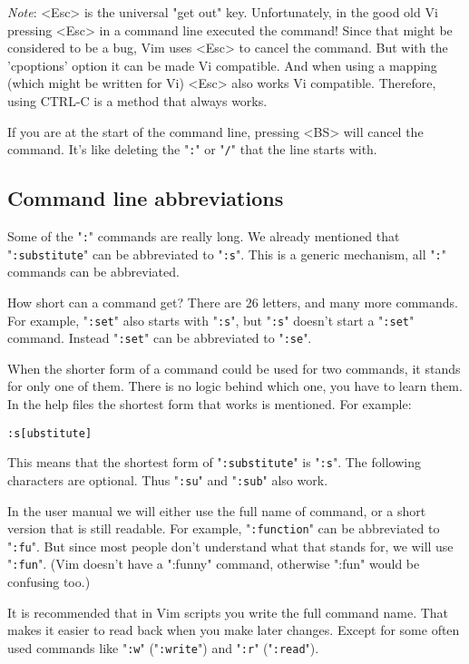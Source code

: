 \emph{Note}:
<Esc> is the universal "get out" key.
Unfortunately, in the good old Vi pressing <Esc> in a command line executed the command!
Since that might be considered to be a bug, Vim uses <Esc> to cancel the command.
But with the 'cpoptions' option it can be made Vi compatible.
And when using a mapping (which might be written for Vi) <Esc> also works Vi compatible.
Therefore, using CTRL-C is a method that always works.

If you are at the start of the command line, pressing <BS> will cancel the command.
It's like deleting the "\verb!:!" or "\verb!/!" that the line starts with.
\subsection{Command line abbreviations}
Some of the "\verb!:!" commands are really long.
We already mentioned that "\verb!:substitute!" can be abbreviated to "\verb!:s!".
This is a generic mechanism, all "\verb!:!" commands can be abbreviated.

How short can a command get?  There are 26 letters, and many more commands.
For example, "\verb!:set!" also starts with "\verb!:s!", but "\verb!:s!" doesn't start a "\verb!:set!" command.
Instead "\verb!:set!" can be abbreviated to "\verb!:se!".

When the shorter form of a command could be used for two commands, it stands for only one of them.
There is no logic behind which one, you have to learn them.
In the help files the shortest form that works is mentioned.
For example:

\begin{Verbatim}[samepage=true]
 :s[ubstitute]
\end{Verbatim}

This means that the shortest form of "\verb!:substitute!" is "\verb!:s!".
The following characters are optional.
Thus "\verb!:su!" and "\verb!:sub!" also work.

In the user manual we will either use the full name of command, or a short version that is still readable.
For example, "\verb!:function!" can be abbreviated to "\verb!:fu!".
But since most people don't understand what that stands for, we will use "\verb!:fun!".
(Vim doesn't have a ":funny" command, otherwise ":fun" would be confusing too.)

It is recommended that in Vim scripts you write the full command name.
That makes it easier to read back when you make later changes.
Except for some often used commands like "\verb!:w!" ("\verb!:write!") and "\verb!:r!" ("\verb!:read!").

